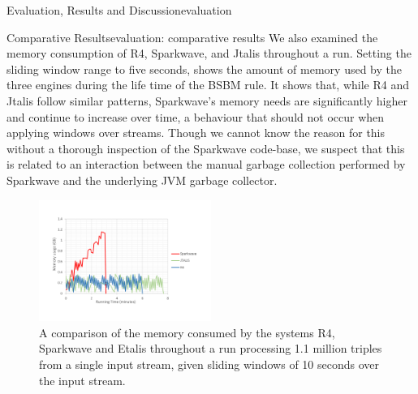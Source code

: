 \begin{nestedsection}{Evaluation, Results and Discussion}{evaluation}
\begin{nestedsection}{Comparative Results}{evaluation: comparative results}
		We also examined the memory consumption of R4, Sparkwave, and Jtalis throughout a run.
		Setting the sliding window range to five seconds,  shows the amount of memory used by the three engines during the life time of the BSBM rule.
		It shows that, while R4 and Jtalis follow similar patterns, Sparkwave's memory needs are significantly higher and continue to increase over time, a behaviour that should not occur when applying windows over streams.
		Though we cannot know the reason for this without a thorough inspection of the Sparkwave code-base, we suspect that this is related to an interaction between the manual garbage collection performed by Sparkwave and the underlying JVM garbage collector.
		\begin{figure}
			\centering
			\includegraphics[width=0.5\textwidth]{memoryConsumptionComparison}
			\caption{A comparison of the memory consumed by the systems R4, Sparkwave and Etalis throughout a run processing 1.1 million triples from a single input stream, given sliding windows of 10 seconds over the input stream.}
		\end{figure}
	\end{nestedsection}

\end{nestedsection}
